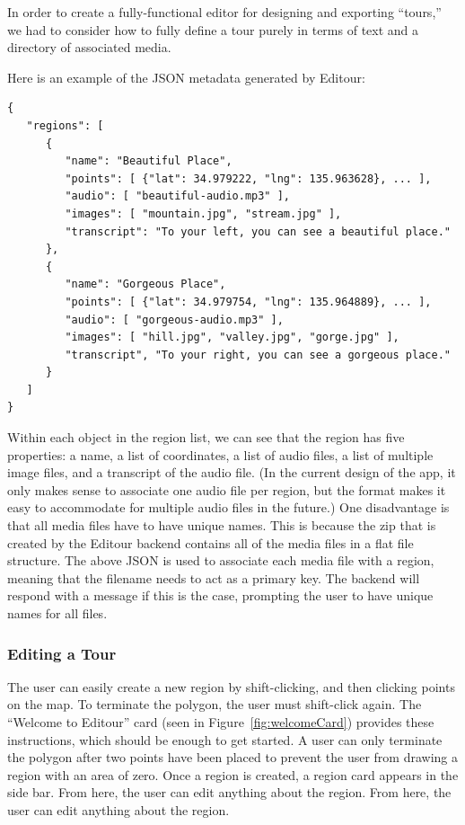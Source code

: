 \documentclass[a4paper, 10pt, american, titlepage]{article}
\begin{document}
In order to create a fully-functional editor for designing and exporting
``tours,'' we had to consider how to fully define a tour purely in terms
of text and a directory of associated media.

Here is an example of the JSON metadata generated by Editour:

\begin{verbatim}
{
   "regions": [
      {
         "name": "Beautiful Place",
         "points": [ {"lat": 34.979222, "lng": 135.963628}, ... ],
         "audio": [ "beautiful-audio.mp3" ],
         "images": [ "mountain.jpg", "stream.jpg" ],
         "transcript": "To your left, you can see a beautiful place."
      },
      {
         "name": "Gorgeous Place",
         "points": [ {"lat": 34.979754, "lng": 135.964889}, ... ],
         "audio": [ "gorgeous-audio.mp3" ],
         "images": [ "hill.jpg", "valley.jpg", "gorge.jpg" ],
         "transcript", "To your right, you can see a gorgeous place."
      }
   ]
}
\end{verbatim}

Within each object in the region list, we can see that the region has five
properties: a name, a list of coordinates, a list of audio files, a list of
multiple image files, and a transcript of the audio file. (In the current
design of the app, it only makes sense to associate one audio file per region,
but the format makes it easy to accommodate for multiple audio files in the
future.) One disadvantage is that all media files have to have unique names.
This is because the zip that is created by the Editour backend contains all of
the media files in a flat file structure. The above JSON is used to associate
each media file with a region, meaning that the filename needs to act as a
primary key. The backend will respond with a message if this is the case,
prompting the user to have unique names for all files.

\subsubsection{Editing a Tour}
\label{sec:editingATour}

The user can easily create a new region by shift-clicking, and then clicking
points on the map.  To terminate the polygon, the user must shift-click again.
The ``Welcome to Editour'' card (seen in Figure~\ref{fig:welcomeCard}) provides
these instructions, which should be enough to get started.  A user can only
terminate the polygon after two points have been placed to prevent the user
from drawing a region with an area of zero. Once a region is created, a region
card appears in the side bar. From here, the user can edit anything about the
region. From here, the user can edit anything about the region.
\end{document}
